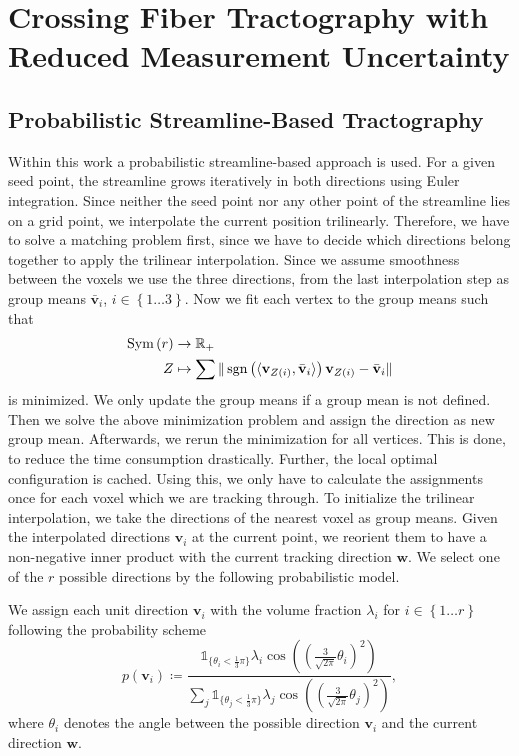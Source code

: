 \section{Crossing Fiber Tractography with Reduced Measurement Uncertainty}

\subsection{Probabilistic Streamline-Based Tractography}

Within this work a probabilistic streamline-based approach is used. For a given
seed point, the streamline grows iteratively in both directions using Euler
integration. Since neither the seed point nor any other point of the streamline
lies on a grid point, we interpolate the current position trilinearly. Therefore,
we have to solve a matching problem first, since we have to decide which
directions belong together to apply the trilinear interpolation. Since we assume
smoothness between the voxels we use the three directions, from the last
interpolation step as group means $\bar{\mathbf{v}}_i$, $i \in \left\{ 1\dots 3 
\right\}$. Now we fit each vertex to the group means such
that 
\begin{align}
	\text{Sym} \left( r  \right) & \rightarrow \mathbb{R}_+ \\ 
	Z & \mapsto \sum \| \operatorname*{sgn} \left( \langle \mathbf{v}_{Z \left( i \right)}
	, \bar{\mathbf{v}}_i \rangle  \right) \mathbf{v}_{Z \left( i \right)} -
\bar{\mathbf{v}}_i
	\|
\end{align}
is minimized. We only update the group means if a group mean is not defined.
Then we solve the above minimization problem and assign the direction as new
group mean. Afterwards, we rerun the minimization for all vertices. This is done,
to reduce the time consumption drastically. Further, the local optimal
configuration is cached. Using this, we only have to calculate the assignments
once for each voxel which we are tracking through. 
To initialize the trilinear interpolation, we take the directions of the nearest voxel as group means.
Given the interpolated directions $\mathbf{v}_i$ at the current point, we
reorient them to have a non-negative inner product with the current tracking
direction $\mathbf{w}$. We select one of the $r$ possible directions by the
following probabilistic model.

We assign each unit direction $\mathbf{v}_i$ with the volume fraction
$\lambda_i$ for $i \in \left\{ 1\dots r \right\}$ following the probability
scheme 
\[
	p \left( \mathbf{v}_i \right) \coloneqq \frac{ \mathbb{1}_{\lbrace\theta_i <
		\frac{1}{3} \pi \rbrace} \lambda_i \cos \left( \left( \frac{3}{\sqrt{2
\pi}} \theta_i \right)^2 \right)}{\sum_j \mathbb{1}_{\lbrace\theta_j <
		\frac{1}{3} \pi \rbrace} \lambda_j \cos \left( \left( \frac{3}{\sqrt{2
\pi}} \theta_j \right)^2 \right) }, 
\]
where $\theta_i$ denotes the angle between the possible direction $\mathbf{v}_i$
and the current direction $\mathbf{w}$. 

